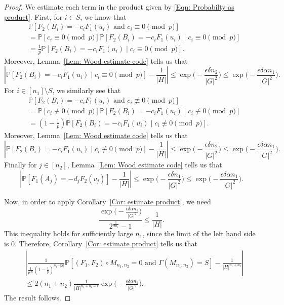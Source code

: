\documentclass[12pt]{amsart}
\theoremstyle{definition}
\newcommand{\PPP}{\mathbb{P}}
\newcommand{\Mnot}{M_{n_1,n_2}}
\newcommand{\abs}[1]{\vert#1\vert}
\begin{document}
\begin{proof}
We estimate each term in the product given by \eqref{Eqn: Probabilty as product}. First, for $i\in S$, 
we know that
\begin{align*}
&\PPP[ F_2(B_i)=-c_iF_1(u_i)\text{ and } c_i\equiv 0\pmod{p}]\\
&=\PPP[c_i\equiv 0\pmod{ p}]
\PPP[F_2(B_i) =- c_iF_1(u_i) \mid c_i\equiv 0\pmod{ p}]\\
&=\frac{1}{p} \PPP[F_2(B_i) =- c_iF_1(u_i) \mid c_i\equiv 0\pmod{ p}].
\end{align*}
Moreover, Lemma~\ref{Lem: Wood estimate code} tells us that
\[
\left|
\PPP[ F_2(B_i)=- c_iF_1(u_i)\mid  c_i\equiv 0\pmod{p}]
- \frac{1}{\abs{H}}
\right|
\leq \exp\Big(-\frac{\epsilon\delta n_2}{|G|^2}\Big)
\leq \exp\Big(-\frac{\epsilon\delta \alpha n_1}{|G|^2}\Big).
\]
For $i\in [n_1]\setminus S$, we similarly see that
\begin{align*}
&\PPP[ F_2(B_i)=-c_iF_1(u_i)\text{ and } c_i\not\equiv 0\pmod{p}]\\
&=\PPP[c_i\not\equiv 0\pmod{ p}]
\PPP[F_2(B_i) =- c_iF_1(u_i) \mid c_i\not\equiv 0\pmod{ p}]\\
&=(1-\tfrac{1}{p}) \PPP[F_2(B_i) =- c_iF_1(u_i) \mid c_i\not\equiv 0\pmod{ p}].
\end{align*}
Moreover, Lemma~\ref{Lem: Wood estimate code} tells us that
\[
\left|
\PPP[ F_2(B_i)=- c_iF_1(u_i)\mid  c_i\not\equiv 0\pmod{p}]
- \frac{1}{\abs{H}}
\right|
\leq \exp\Big(-\frac{\epsilon\delta n_2}{|G|^2}\Big)
\leq \exp\Big(-\frac{\epsilon\delta \alpha n_1}{|G|^2}\Big).
\]
Finally for $j\in[n_2]$, Lemma~\ref{Lem: Wood estimate code} tells us that
\[
\left|
\PPP[F_1(A_j)=-d_jF_2(v_j)]
-\frac{1}{\abs{H}}
\right|
\leq \exp\Big(-\frac{\epsilon\delta n_1}{|G|^2}\Big)
\leq \exp\Big(-\frac{\epsilon\delta \alpha n_1}{|G|^2}\Big).
\]

Now, in order to apply Corollary~\ref{Cor: estimate product}, we need
\[
\frac{\exp\big(-\frac{\epsilon\delta \alpha n_1}{|G|^2}\big)}{2^{\frac{1}{2n_1}}-1}
\leq \frac{1}{\abs{H}}.
\]
This inequality holds for sufficiently large $n_1$, since the limit of the left hand side is $0$. Therefore, Corollary~\ref{Cor: estimate product} tells us that
\begin{align*}
&\left|
\frac{1}{\frac{1}{p^{\abs{S}}}(1-\frac{1}{p})^{n_1-\abs{S}}} 
\PPP[(F_1,F_2)\circ \Mnot=0 \text{ and }\Gamma(\Mnot)=S] 
-  \frac{1}{|H|^{n_1+n_2}}
\right|\\
&\leq 2(n_1+n_2)\frac{1}{\abs{H}^{n_1+n_2-1}} \exp\Big(-\frac{\epsilon\delta \alpha n_1}{|G|^2}\Big).
\end{align*}
The result follows.
\end{proof}
\end{document}
